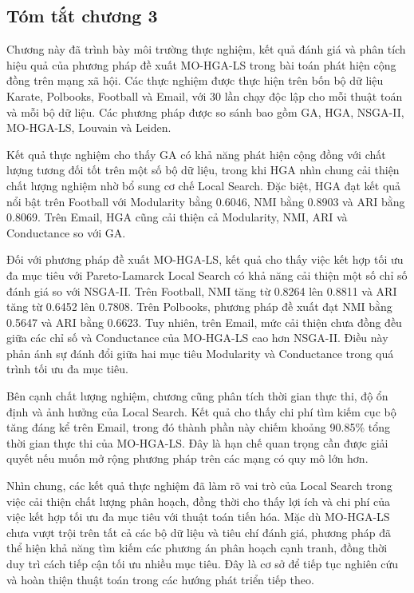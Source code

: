 \documentclass[14pt,a4paper]{extarticle}
\begin{document}
\subsection{Tóm tắt chương 3}

Chương này đã trình bày môi trường thực nghiệm, kết quả đánh giá và phân tích hiệu quả của phương pháp đề xuất MO-HGA-LS trong bài toán phát hiện cộng đồng trên mạng xã hội. Các thực nghiệm được thực hiện trên bốn bộ dữ liệu Karate, Polbooks, Football và Email, với 30 lần chạy độc lập cho mỗi thuật toán và mỗi bộ dữ liệu. Các phương pháp được so sánh bao gồm GA, HGA, NSGA-II, MO-HGA-LS, Louvain và Leiden.

Kết quả thực nghiệm cho thấy GA có khả năng phát hiện cộng đồng với chất lượng tương đối tốt trên một số bộ dữ liệu, trong khi HGA nhìn chung cải thiện chất lượng nghiệm nhờ bổ sung cơ chế Local Search. Đặc biệt, HGA đạt kết quả nổi bật trên Football với Modularity bằng 0.6046, NMI bằng 0.8903 và ARI bằng 0.8069. Trên Email, HGA cũng cải thiện cả Modularity, NMI, ARI và Conductance so với GA.

Đối với phương pháp đề xuất MO-HGA-LS, kết quả cho thấy việc kết hợp tối ưu đa mục tiêu với Pareto-Lamarck Local Search có khả năng cải thiện một số chỉ số đánh giá so với NSGA-II. Trên Football, NMI tăng từ 0.8264 lên 0.8811 và ARI tăng từ 0.6452 lên 0.7808. Trên Polbooks, phương pháp đề xuất đạt NMI bằng 0.5647 và ARI bằng 0.6623. Tuy nhiên, trên Email, mức cải thiện chưa đồng đều giữa các chỉ số và Conductance của MO-HGA-LS cao hơn NSGA-II. Điều này phản ánh sự đánh đổi giữa hai mục tiêu Modularity và Conductance trong quá trình tối ưu đa mục tiêu.

Bên cạnh chất lượng nghiệm, chương cũng phân tích thời gian thực thi, độ ổn định và ảnh hưởng của Local Search. Kết quả cho thấy chi phí tìm kiếm cục bộ tăng đáng kể trên Email, trong đó thành phần này chiếm khoảng 90.85\% tổng thời gian thực thi của MO-HGA-LS. Đây là hạn chế quan trọng cần được giải quyết nếu muốn mở rộng phương pháp trên các mạng có quy mô lớn hơn.

Nhìn chung, các kết quả thực nghiệm đã làm rõ vai trò của Local Search trong việc cải thiện chất lượng phân hoạch, đồng thời cho thấy lợi ích và chi phí của việc kết hợp tối ưu đa mục tiêu với thuật toán tiến hóa. Mặc dù MO-HGA-LS chưa vượt trội trên tất cả các bộ dữ liệu và tiêu chí đánh giá, phương pháp đã thể hiện khả năng tìm kiếm các phương án phân hoạch cạnh tranh, đồng thời duy trì cách tiếp cận tối ưu nhiều mục tiêu. Đây là cơ sở để tiếp tục nghiên cứu và hoàn thiện thuật toán trong các hướng phát triển tiếp theo.
\end{document}
